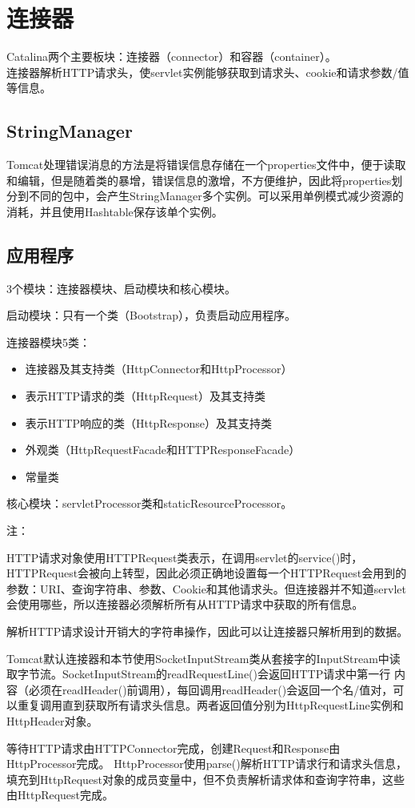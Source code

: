 \chapter{连接器}
Catalina两个主要板块：连接器（connector）和容器（container）。\\
连接器解析HTTP请求头，使servlet实例能够获取到请求头、cookie和请求参数/值等信息。
\section{StringManager}
Tomcat处理错误消息的方法是将错误信息存储在一个properties文件中，便于读取和编辑，但是随着类的暴增，错误信息的激增，不方便维护，因此将properties划分到不同的包中，会产生StringManager多个实例。可以采用单例模式减少资源的消耗，并且使用Hashtable保存该单个实例。
\section{应用程序}
3个模块：连接器模块、启动模块和核心模块。\par
启动模块：只有一个类（Bootstrap），负责启动应用程序。\par
连接器模块5类：
\begin{itemize}
	\item 连接器及其支持类（HttpConnector和HttpProcessor）
	\item 表示HTTP请求的类（HttpRequest）及其支持类
	\item 表示HTTP响应的类（HttpResponse）及其支持类
	\item 外观类（HttpRequestFacade和HTTPResponseFacade）
	\item 常量类
\end{itemize}
\par 核心模块：servletProcessor类和staticResourceProcessor。
\par 注：
\par HTTP请求对象使用HTTPRequest类表示，在调用servlet的service()时，HTTPRequest会被向上转型，因此必须正确地设置每一个HTTPRequest会用到的参数：URI、查询字符串、参数、Cookie和其他请求头。但连接器并不知道servlet会使用哪些，所以连接器必须解析所有从HTTP请求中获取的所有信息。
\par 解析HTTP请求设计开销大的字符串操作，因此可以让连接器只解析用到的数据。
\par Tomcat默认连接器和本节使用SocketInputStream类从套接字的InputStream中读取字节流。SocketInputStream的readRequestLine()会返回HTTP请求中第一行
内容（必须在readHeader()前调用），每回调用readHeader()会返回一个名/值对，可以重复调用直到获取所有请求头信息。两者返回值分别为HttpRequestLine实例和HttpHeader对象。
\par 等待HTTP请求由HTTPConnector完成，创建Request和Response由HttpProcessor完成。
HttpProcessor使用parse()解析HTTP请求行和请求头信息，填充到HttpRequest对象的成员变量中，但不负责解析请求体和查询字符串，这些由HttpRequest完成。
